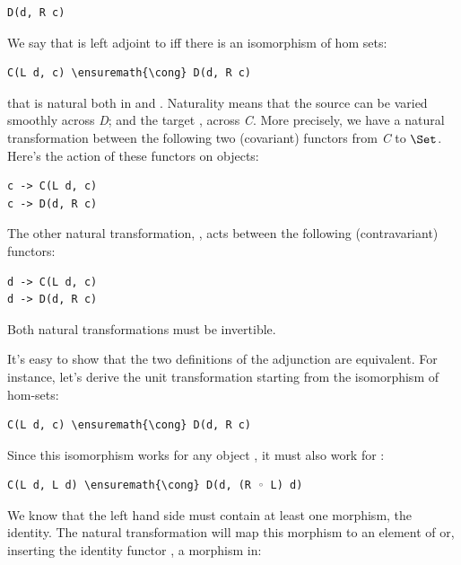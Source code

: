 \begin{Verbatim}[commandchars=\\\{\}]
D(d, R c)
\end{Verbatim}
We say that  is left adjoint to  iff there is an
isomorphism of hom sets:

\begin{Verbatim}[commandchars=\\\{\}]
C(L d, c) \ensuremath{\cong} D(d, R c)
\end{Verbatim}
that is natural both in  and .
Naturality means that the source  can be varied smoothly
across \emph{D}; and the target , across \emph{C}. More
precisely, we have a natural transformation  between the
following two (covariant) functors from \emph{C} to $\Set$. Here's
the action of these functors on objects:

\begin{Verbatim}[commandchars=\\\{\}]
c -> C(L d, c)
c -> D(d, R c)
\end{Verbatim}
The other natural transformation, , acts between the following
(contravariant) functors:

\begin{Verbatim}[commandchars=\\\{\}]
d -> C(L d, c)
d -> D(d, R c)
\end{Verbatim}
Both natural transformations must be invertible.

It's easy to show that the two definitions of the adjunction are
equivalent. For instance, let's derive the unit transformation starting
from the isomorphism of hom-sets:

\begin{Verbatim}[commandchars=\\\{\}]
C(L d, c) \ensuremath{\cong} D(d, R c)
\end{Verbatim}
Since this isomorphism works for any object , it must also
work for :

\begin{Verbatim}[commandchars=\\\{\}]
C(L d, L d) \ensuremath{\cong} D(d, (R ◦ L) d)
\end{Verbatim}
We know that the left hand side must contain at least one morphism, the
identity. The natural transformation will map this morphism to an
element of  or, inserting the identity
functor , a morphism in:

